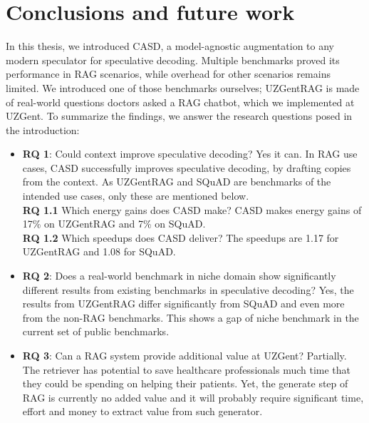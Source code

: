 
\chapter{Conclusions and future work}
\label{sec:conclusion_future_work}

In this thesis, we introduced CASD, a model-agnostic augmentation to any modern speculator for speculative decoding. Multiple benchmarks proved its performance in RAG scenarios, while overhead for other scenarios remains limited. We introduced one of those benchmarks ourselves; UZGentRAG is made of real-world questions doctors asked a RAG chatbot, which we implemented at UZGent. To summarize the findings, we answer the research questions posed in the introduction:

\begin{itemize}
    \item \textbf{RQ 1}: Could context improve speculative decoding? Yes it can. In RAG use cases, CASD successfully improves speculative decoding, by drafting copies from the context. As UZGentRAG and SQuAD are benchmarks of the intended use cases, only these are mentioned below.
    \\ \textbf{RQ 1.1} Which energy gains does CASD make? CASD makes energy gains of 17\% on UZGentRAG and 7\% on SQuAD.
    \\ \textbf{RQ 1.2} Which speedups does CASD deliver? The speedups are 1.17 for UZGentRAG and 1.08 for SQuAD.
    \item \textbf{RQ 2}: Does a real-world benchmark in niche domain show significantly different results from existing benchmarks in speculative decoding? Yes, the results from UZGentRAG differ significantly from SQuAD and even more from the non-RAG benchmarks. This shows a gap of niche benchmark in the current set of public benchmarks.
    \item \textbf{RQ 3}: Can a RAG system provide additional value at UZGent? Partially. The retriever has potential to save healthcare professionals much time that they could be spending on helping their patients. Yet, the generate step of RAG is currently no added value and it will probably require significant time, effort and money to extract value from such generator.
\end{itemize}

